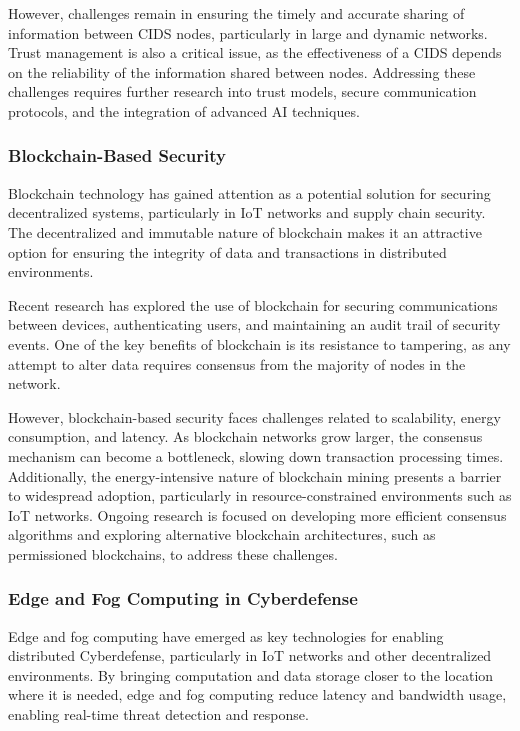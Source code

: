 However, challenges remain in ensuring the timely and accurate sharing of information between CIDS nodes, particularly in large and dynamic networks. Trust management is also a critical issue, as the effectiveness of a CIDS depends on the reliability of the information shared between nodes. Addressing these challenges requires further research into trust models, secure communication protocols, and the integration of advanced AI techniques.

\subsubsection{Blockchain-Based Security}

Blockchain technology has gained attention as a potential solution for securing decentralized systems, particularly in IoT networks and supply chain security. The decentralized and immutable nature of blockchain makes it an attractive option for ensuring the integrity of data and transactions in distributed environments.

Recent research has explored the use of blockchain for securing communications between devices, authenticating users, and maintaining an audit trail of security events. One of the key benefits of blockchain is its resistance to tampering, as any attempt to alter data requires consensus from the majority of nodes in the network.

However, blockchain-based security faces challenges related to scalability, energy consumption, and latency. As blockchain networks grow larger, the consensus mechanism can become a bottleneck, slowing down transaction processing times. Additionally, the energy-intensive nature of blockchain mining presents a barrier to widespread adoption, particularly in resource-constrained environments such as IoT networks. Ongoing research is focused on developing more efficient consensus algorithms and exploring alternative blockchain architectures, such as permissioned blockchains, to address these challenges.

\subsubsection{Edge and Fog Computing in Cyberdefense}

Edge and fog computing have emerged as key technologies for enabling distributed Cyberdefense, particularly in IoT networks and other decentralized environments. By bringing computation and data storage closer to the location where it is needed, edge and fog computing reduce latency and bandwidth usage, enabling real-time threat detection and response.

